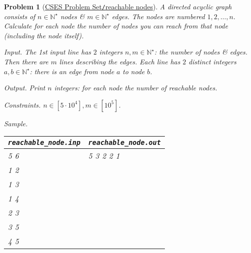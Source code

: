\documentclass{article}
\newtheorem{problem}{Problem}
\begin{document}
\begin{problem}[\href{https://cses.fi/problemset/task/2138}{CSES Problem Set{\tt/}reachable nodes}]
    A directed acyclic graph consists of $n\in\mathbb{N}^\star$ nodes \& $m\in\mathbb{N}^\star$ edges. The nodes are numbered $1,2,\ldots,n$. Calculate for each node the number of nodes you can reach from that node (including the node itself).
    \item {\sf Input.} The 1st input line has $2$ integers $n,m\in\mathbb{N}^\star$: the number of nodes \& edges. Then there are $m$ lines describing the edges. Each line has $2$ distinct integers $a,b\in\mathbb{N}^\star$: there is an edge from node $a$ to node $b$.
    \item {\sf Output.} Print $n$ integers: for each node the number of reachable nodes.
    \item {\sf Constraints.} $n\in[5\cdot10^4],m\in[10^5]$.
    \item {\sf Sample.}
    \begin{table}[H]
        \centering
        \begin{tabular}{|l|l|}
            \hline
            \verb|reachable_node.inp| & \verb|reachable_node.out| \\
            \hline
            5 6 & 5 3 2 2 1 \\
            1 2 & \\
            1 3 & \\
            1 4 & \\
            2 3 & \\
            3 5 & \\
            4 5 & \\
            \hline
        \end{tabular}
    \end{table}
\end{problem}
\end{document}
